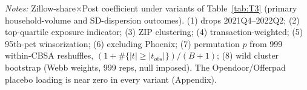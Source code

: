 \begin{table}[!htbp]\centering
\caption{Exit design: robustness and inference}
\label{tab:T5}
\begin{minipage}{0.97\linewidth}\footnotesize\vspace{2pt}
\emph{Notes:} Zillow-share$\times$Post coefficient under variants of
Table~\ref{tab:T3} (primary household-volume and SD-dispersion outcomes).
(1) drops 2021Q4--2022Q2; (2) top-quartile exposure indicator; (3) ZIP
clustering; (4) transaction-weighted; (5) 95th-pct winsorization; (6)
excluding Phoenix; (7) permutation $p$ from 999 within-CBSA reshuffles,
$(1+\#\{|t|\geq|t_{obs}|\})/(B+1)$; (8) wild cluster bootstrap (Webb
weights, 999 reps, null imposed). The Opendoor/Offerpad placebo loading is
near zero in every variant (Appendix).
\end{minipage}
\end{table}
